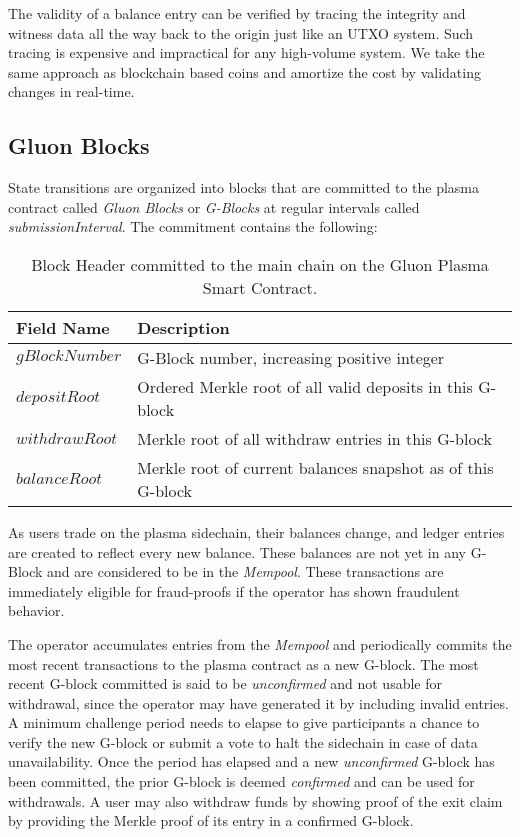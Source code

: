 \documentclass[12pt,a4paper]{article}
\begin{document}
The validity of a balance entry can be verified by tracing the integrity and witness data all the way back to the origin just like an UTXO system. Such tracing is expensive and impractical for any high-volume system. We take the same approach as blockchain based coins and amortize the cost by validating changes in real-time. 

\subsection{Gluon Blocks}
State transitions are organized into blocks that are committed to the plasma contract called \emph{Gluon Blocks} or \emph{G-Blocks} at regular intervals called \emph{submissionInterval}. The commitment contains the following:

\begin{table}[ht]
\caption{Block Header committed to the main chain on the Gluon Plasma Smart Contract.}
\centering
\begin{tabular}{|l|l|}
\hline
\bfseries Field Name &\bfseries  Description \\
\hline
$gBlockNumber$ & G-Block number, increasing positive integer \\ 
$depositRoot$ & Ordered Merkle root of all valid deposits in this G-block \\ 
$withdrawRoot$ & Merkle root of all withdraw entries in this G-block \\ 
$balanceRoot$ & Merkle root of current balances snapshot as of this G-block\\ 

\hline
\end{tabular}
\end{table}

As users trade on the plasma sidechain, their balances change, and ledger entries are created to reflect every new balance. These balances are not yet in any G-Block and are considered to be in the \emph{Mempool}. These transactions are immediately eligible for fraud-proofs if the operator has shown fraudulent behavior. 

The operator accumulates entries from the \emph{Mempool} and periodically commits the most recent transactions to the plasma contract as a new G-block. The most recent G-block committed is said to be \emph{unconfirmed} and not usable for withdrawal, since the operator may have generated it by including invalid entries. A minimum challenge period needs to elapse to give participants a chance to verify the new G-block or submit a vote to halt the sidechain in case of data unavailability. Once the period has elapsed and a new \emph{unconfirmed} G-block has been committed, the prior G-block is deemed \emph{confirmed} and can be used for withdrawals. A user may also withdraw funds by showing proof of the exit claim by providing the Merkle proof of its entry in a confirmed G-block.
\end{document}
